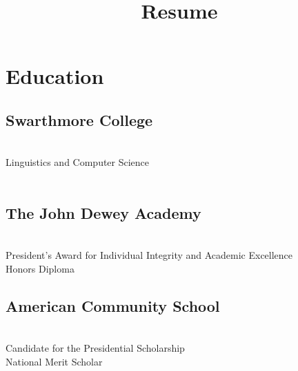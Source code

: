 \documentclass[]{deedy-resume-openfont}
\begin{document}
%
%
\lastupdated

%
%

\title{Resume}

%
%

\begin{minipage}[t]{0.33\textwidth} 


\section{Education} 

\subsection{Swarthmore College}
 \\
Linguistics and Computer Science \\
 \\
\sectionsep

\subsection{The John Dewey Academy}
 \\
President’s Award for Individual Integrity and Academic Excellence \\Honors Diploma
\sectionsep

\subsection{American Community \hfill \break School}
 \\
Candidate for the Presidential Scholarship \\
National Merit Scholar \\
 \\


\end{minipage}
\end{document}
